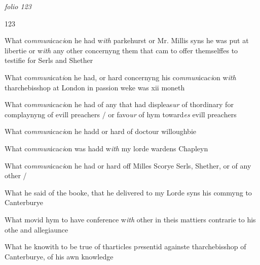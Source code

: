 \documentclass[12pt, a4paper]{book}
\begin{document}
\textit{folio 123}



\begin{flushright}{\color{Mahogany}123}\end{flushright}
            		
		\ifthenelse{\isodd{\thepage}}
		{\reversemarginpar}
		{\normalmarginpar}
		What co\textit{mmun}icac\textit{i}on he had w\textit{ith} parkehurst or Mr. Millis syns he
 was put at libertie or w\textit{ith} any other concernyng them that
 cam to offer themselffes to testifie for Serls and Shether
            		
		\ifthenelse{\isodd{\thepage}}
		{\reversemarginpar}
		{\normalmarginpar}
		What co\textit{mmun}icat\textit{i}on he had, or hard concernyng his co\textit{mmun}icac\textit{i}on w\textit{ith}
            			tharchebisshop at London in passion weke was xii moneth

		\ifthenelse{\isodd{\thepage}}
		{\reversemarginpar}
		{\normalmarginpar}
		What co\textit{mmun}icac\textit{i}on he had of any that had displeas\textit{ur} of thordinary
 for complaynyng of evill preachers / or favo\textit{ur} of hym toward\textit{es}
 evill preachers
            		
		\ifthenelse{\isodd{\thepage}}
		{\reversemarginpar}
		{\normalmarginpar}
		What co\textit{mmun}icac\textit{i}on he hadd or hard of doctour willoughbie

		\ifthenelse{\isodd{\thepage}}
		{\reversemarginpar}
		{\normalmarginpar}
		What co\textit{mmun}icac\textit{i}on was hadd w\textit{ith} my lorde wardens Chapleyn
            		
		\ifthenelse{\isodd{\thepage}}
		{\reversemarginpar}
		{\normalmarginpar}
		What co\textit{mmun}icac\textit{i}on he had or hard off Milles Scorye
 Serls, Shether, or of any other /
            		
		\ifthenelse{\isodd{\thepage}}
		{\reversemarginpar}
		{\normalmarginpar}
		What he said of the booke, that he delivered to my Lorde
            			syns his commyng to Canterburye
            		
		\ifthenelse{\isodd{\thepage}}
		{\reversemarginpar}
		{\normalmarginpar}
		What movid hym to have conference w\textit{ith} other in theis mattiers
 contrarie to his othe and allegiaunce
            		
		\ifthenelse{\isodd{\thepage}}
		{\reversemarginpar}
		{\normalmarginpar}
		What he knowith to be true of tharticles p\textit{re}sentid againste
            			tharchebisshop of Canterburye, of his awn knowledge
            		
\end{document}
